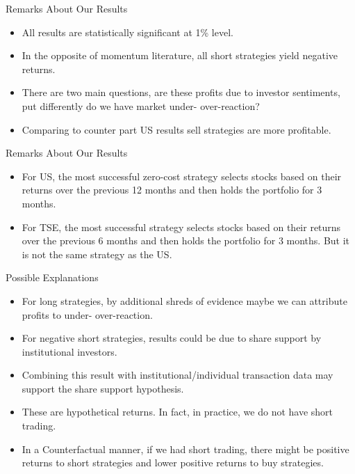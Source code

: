 \documentclass{beamer}
\begin{document}
\begin{frame}{Remarks About Our Results}
    \begin{itemize}
        \item All results are statistically significant at 1\% level.
        \item In the opposite of momentum literature, all short strategies yield negative returns.
        \item There are two main questions, are these profits due to investor sentiments, put differently do we have market under- over-reaction?
        \item Comparing to counter part US results sell strategies are more profitable.
    \end{itemize}
\end{frame}

\begin{frame}{Remarks About Our Results}
    \begin{itemize}
        \item For US, the most successful zero-cost strategy selects stocks based on their returns over the previous 12 months and then holds the portfolio for 3 months.
        \item For TSE, the most successful strategy selects stocks based on their returns over the previous 6 months and then holds the portfolio for 3 months. But it is not the same strategy as the US.
    \end{itemize}
\end{frame}

\begin{frame}{Possible Explanations}
    \begin{itemize}
        \item For long strategies, by additional shreds of evidence maybe we can attribute profits to under- over-reaction.
        \item For negative short strategies, results could be due to share support by institutional investors.
        \item Combining this result with institutional/individual transaction data may support the share support hypothesis.
        \item These are hypothetical returns. In fact, in practice, we do not have short trading.
        \item In a Counterfactual manner, if we had short trading, there might be positive returns to short strategies and lower positive returns to buy strategies.
    \end{itemize}
\end{frame}
\end{document}
